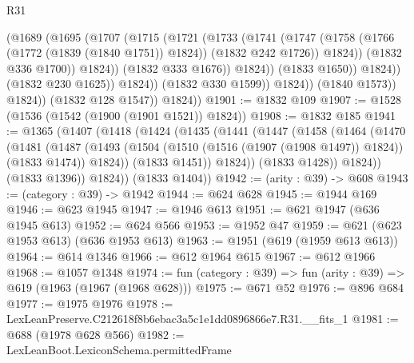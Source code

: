 \begin{lexlean}{R31}
\begin{coremodule}
                                  (@1689
                                    (@1695
                                      (@1707
                                        (@1715
                                          (@1721
                                            (@1733
                                              (@1741
                                                (@1747
                                                  (@1758
                                                    (@1766 (@1772 (@1839 (@1840 @1751)) @1824))
                                                    (@1832 @242 @1726))
                                                  @1824))
                                              (@1832 @336 @1700))
                                            @1824))
                                        (@1832 @333 @1676))
                                      @1824))
                                  (@1833 @1650))
                                @1824))
                            (@1832 @230 @1625))
                          @1824))
                      (@1832 @330 @1599))
                    @1824))
                (@1840 @1573))
              @1824))
          (@1832 @128 @1547))
        @1824))
@1901 := @1832 @109
@1907 := @1528 (@1536 (@1542 (@1900 (@1901 @1521)) @1824))
@1908 := @1832 @185
@1941 := @1365
    (@1407
      (@1418
        (@1424
          (@1435
            (@1441
              (@1447
                (@1458
                  (@1464
                    (@1470
                      (@1481
                        (@1487
                          (@1493
                            (@1504 (@1510 (@1516 (@1907 (@1908 @1497)) @1824)) (@1833 @1474))
                            @1824))
                        (@1833 @1451))
                      @1824))
                  (@1833 @1428))
                @1824))
            (@1833 @1396))
          @1824))
      (@1833 @1404))
@1942 := (arity : @39) -> @608
@1943 := (category : @39) -> @1942
@1944 := @624 @628
@1945 := @1944 @169
@1946 := @623 @1945
@1947 := @1946 @613
@1951 := @621 @1947 (@636 @1945 @613)
@1952 := @624 @566
@1953 := @1952 @47
@1959 := @621 (@623 @1953 @613) (@636 @1953 @613)
@1963 := @1951 (@619 (@1959 @613 @613))
@1964 := @614 @1346
@1966 := @612 @1964 @615
@1967 := @612 @1966
@1968 := @1057 @1348
@1974 := fun (category : @39) => fun (arity : @39) => @619 (@1963 (@1967 (@1968 @628)))
@1975 := @671 @52
@1976 := @896 @684
@1977 := @1975 @1976
@1978 := LexLeanPreserve.C212618f8b6ebac3a5c1e1dd0896866e7.R31.__fits_1
@1981 := @688 (@1978 @628 @566)
@1982 := LexLeanBoot.LexiconSchema.permittedFrame

\end{coremodule}
\end{lexlean}
